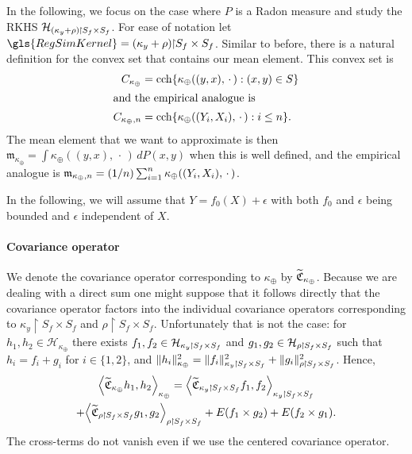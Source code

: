 \documentclass[10pt]{amsart}
\theoremstyle{definition}\newtheorem{defi}[theo]{Definition}\newtheorem{rema}[theo]{Remark}\newtheorem{exam}[theo]{Example}\newtheorem{exem}[theo]{Example}\newtheorem{nota}[theo]{Notation}
\theoremstyle{remark}
\DeclareMathOperator{\cch}{cch}
\newcommand{\restrr}
{\!\!\upharpoonright\!\!}
\newcommand{\cH}{\mathcal{H}}
\newcommand{\fkC}{\mathfrak{C}}
\newcommand{\Cov}{\tilde{\fkC}}
\newcommand{\mean}{\mathfrak{m}}
\newcommand*{\mk}{\mkern -1mu}
\let\oldtilde\tilde
\renewcommand*{\tilde}[1]{\mathchoice{\widetilde{#1}}{\widetilde{#1}}{\oldtilde{#1}}{\oldtilde{#1}}}
\let\originalleft\left
\let\originalright\right
\renewcommand{\left}{\mathopen{}\mathclose\bgroup\originalleft}
\renewcommand{\right}{\aftergroup\egroup\originalright}
\begin{document}
In the following, we focus on the case where $P$ is a Radon measure and study the RKHS $\cH_{(\kappa_y + \rho)\mk\upharpoonright\mk S_f \times S_f}$. For ease of notation let $\gls{RegSimKernel} = (\kappa_y + \rho)\restrr S_f \times S_f$. Similar to before, there is a natural definition for the convex set that contains our mean element. This convex set is
\begin{align*}
C_{\kappa_\oplus} &= \cch \{\kappa_{\oplus}((y,x),\,\cdot\,) : (x,y) \in S\}
\\
\intertext{and the empirical analogue is}
C_{\kappa_\oplus,n} &= \cch \{ \kappa_{\oplus}((Y_i,X_i),\,\cdot\,) : i \leq n\}.
\end{align*}
The mean element that we want to approximate is then $\mean_{\kappa_\oplus} = \int \kappa_{\oplus}((y,x),\,\cdot\,) \,dP(x,y)$ when this is well defined, and the empirical analogue is $\mean_{\kappa_\oplus,n} = (1/n) \sum_{i=1}^n \kappa_{\oplus}((Y_i,\linebreak X_i),\,\cdot\,)$.


In the following, we will assume that $Y = f_0(X) + \epsilon$ with both $f_0$ and $\epsilon$ being bounded and $\epsilon$ independent of $X$.

\paragraph{Covariance operator}
We denote the covariance operator corresponding to $\kappa_\oplus$ by $\Cov_{\kappa_\oplus}$. Because we are dealing with a direct sum one might suppose that it follows directly that the covariance operator factors into the individual covariance operators corresponding to $\kappa_y \restrr S_f \times S_f$ and $\rho\restrr S_f \times S_f$. Unfortunately that is not the case: for $h_1,h_2 \in \cH_{\kappa_\oplus}$ there exists $f_1,f_2 \in \cH_{\kappa_y\mk \upharpoonright\mk S_f \times S_f}$ and $g_1,g_2\in \cH_{\rho\mk \upharpoonright\mk S_f \times S_f }$ such that $h_i = f_i + g_i$ for $i \in \{1,2\}$, and $\|h_i\|^2_{\kappa_\oplus} = \|f_i\|^2_{\kappa_y \mk\upharpoonright\mk S_f \times S_f} + \|g_i\|^2_{\rho \mk\upharpoonright\mk S_f \times S_f }$. Hence,
\begin{multline} \label{eq:cov_for_directsum}
\left\langle \Cov_{\kappa_\oplus} h_1, h_2 \right\rangle_{\kappa_\oplus} =
\left\langle \Cov_{\kappa_y \mk\upharpoonright\mk S_f \times S_f} f_1, f_2 \right\rangle_{\kappa_y\mk\upharpoonright\mk S_f \times S_f}\\
+\left\langle \Cov_{\rho\mk\upharpoonright\mk S_f \times S_f} g_1, g_2 \right\rangle_{\rho\mk\upharpoonright\mk S_f \times S_f} + E(f_1 \times g_2) + E(f_2 \times g_1).
\end{multline}
The cross-terms do not vanish even if we use the centered covariance operator.
\end{document}
